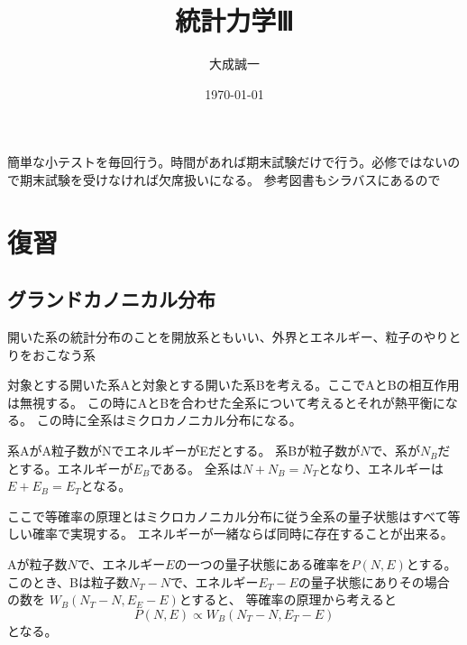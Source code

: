 \documentclass[titlepage]{ltjsarticle}
\begin{document}
\title{統計力学Ⅲ}
\author{大成誠一}
\date{\today}
\maketitle


簡単な小テストを毎回行う。時間があれば期末試験だけで行う。必修ではないので期末試験を受けなければ欠席扱いになる。
参考図書もシラバスにあるので

\section*{復習}
\subsection{グランドカノニカル分布}
開いた系の統計分布のことを開放系ともいい、外界とエネルギー、粒子のやりとりをおこなう系

対象とする開いた系Aと対象とする開いた系Bを考える。ここでAとBの相互作用は無視する。
この時にAとBを合わせた全系について考えるとそれが熱平衡になる。
この時に全系はミクロカノニカル分布になる。

系AがA粒子数がNでエネルギーがEだとする。
系Bが粒子数が\(N\)で、系が\(N_B\)だとする。エネルギーが\(E_B\)である。
全系は\(N+N_B=N_T\)となり、エネルギーは\(E+E_B=E_T\)となる。

ここで等確率の原理とはミクロカノニカル分布に従う全系の量子状態はすべて等しい確率で実現する。
エネルギーが一緒ならば同時に存在することが出来る。

Aが粒子数\(N\)で、エネルギー\(E\)の一つの量子状態にある確率を\(P(N,E)\)とする。
このとき、Bは粒子数\(N_T-N\)で、エネルギー\(E_T-E\)の量子状態にありその場合の数を
\(W_B(N_T-N,E_E-E)\)とすると、
等確率の原理から考えると
\begin{equation}
  P(N,E) \propto W_B(N_T-N,E_T-E)
\end{equation}
となる。
\end{document}
